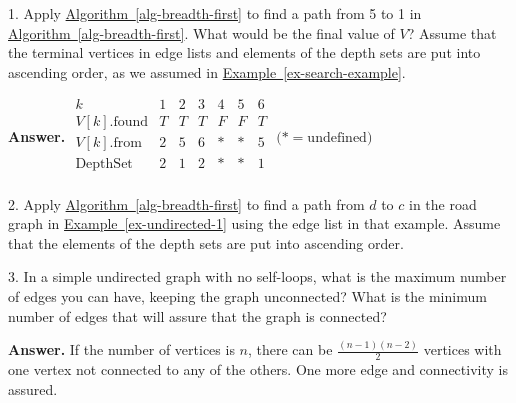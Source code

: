 \documentclass[10pt,]{book}
\theoremstyle{plain}
\theoremstyle{definition}
\theoremstyle{definition}
\theoremstyle{definition}
\theoremstyle{definition}
\theoremstyle{definition}
\numberwithin{equation}{section}
\begin{document}
\begin{exercisegroup}
\item[1.]\hypertarget{exercise-16}{} Apply \hyperref[alg-breadth-first]{Algorithm~\ref{alg-breadth-first}} to find a path from 5 to 1 in \hyperref[alg-breadth-first]{Algorithm~\ref{alg-breadth-first}}. What would be the final value of \(V\)? Assume that the terminal vertices
in edge lists and elements of the depth sets are put into ascending order, as we assumed in \hyperref[ex-search-example]{Example~\ref{ex-search-example}}.%
\par\smallskip
\par\smallskip
\noindent\textbf{Answer.}\hypertarget{answer-3}{}\quad
  \(\begin{array}{ccccccc}
 k & 1 & 2 & 3 & 4 & 5 & 6 \\
 V[k].\text{found} & T & T & T & F & F & T \\
 V[k].\text{from} & 2 & 5 & 6 & * & * & 5 \\
 \text{Depth} \text{Set} & 2 & 1 & 2 & * & * & 1 \\
\end{array}\) \(\text{(*} = \text{undefined})\)

%
\item[2.]\hypertarget{exercise-17}{} Apply \hyperref[alg-breadth-first]{Algorithm~\ref{alg-breadth-first}} to find a path from \(d\) to \(c\)  in the road graph in \hyperref[ex-undirected-1]{Example~\ref{ex-undirected-1}} using the edge list in that example. Assume that the elements
of the depth sets are put into ascending order.%
\par\smallskip
\item[3.]\hypertarget{exercise-18}{} In a simple undirected graph with no self-loops, what is the maximum number of edges you can have, keeping the graph unconnected? What is the
minimum number of edges that will assure that the graph is connected?%
\par\smallskip
\par\smallskip
\noindent\textbf{Answer.}\hypertarget{answer-4}{}\quad
 If the number of vertices is \(n\), there can be \(\frac{(n-1)(n-2)}{2}\) vertices with one vertex not connected to any of the others. One
more edge and connectivity is assured.


\end{exercisegroup}
\end{document}
